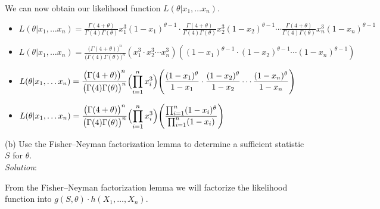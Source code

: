 \documentclass[12pt]{article}
\newcommand{\XB}{\color{black}}
\newcommand{\XV}{\color{violet}}
\begin{document}
We can now obtain our likelihood function $ L(\theta | x_{1}, \dots x_{n}) $. \\
\begin{itemize}
    \item $ \displaystyle L(\theta | x_{1}, \dots x_{n}) = \frac{\Gamma(4 + \theta)}{\Gamma(4)\Gamma(\theta)}x_{1}^{3}(1 - x_{1})^{\theta - 1} \cdot \frac{\Gamma(4 + \theta)}{\Gamma(4)\Gamma(\theta)}x_{2}^{3}(1 - x_{2})^{\theta - 1} \cdots \frac{\Gamma(4 + \theta)}{\Gamma(4)\Gamma(\theta)}x_{n}^{3}(1 - x_{n})^{\theta - 1} $
    \item $ \displaystyle L(\theta | x_{1}, \dots x_{n}) = \frac{ \bigl( \Gamma(4 + \theta) \bigr)^{n}}{ \bigl( \Gamma(4)\Gamma(\theta) \bigr)^{n}} (x_{1}^{3} \cdot x_{2}^{3} \cdots x_{n}^{3})((1 - x_{1})^{\theta - 1} \cdot (1 - x_{2})^{\theta - 1} \cdots (1 - x_{n})^{\theta - 1}) $
    \item $ \displaystyle L(\theta | x_{1}, \dots x_{n}) = \frac{ \bigl( \Gamma(4 + \theta) \bigr)^{n}}{ \bigl( \Gamma(4)\Gamma(\theta) \bigr)^{n}} \Bigl( \prod_{i=1}^{n} x_{i}^{3} \Bigr) \Biggl( \frac{(1 - x_{1})^{\theta}}{1 - x_{1}} \cdot \frac{(1 - x_{2})^{\theta}}{1 - x_{2}} \cdots \frac{(1 - x_{n})^{\theta}}{1 - x_{n}} \Biggr) $
    \item $ \displaystyle L(\theta | x_{1}, \dots x_{n}) = \frac{ \bigl( \Gamma(4 + \theta) \bigr)^{n}}{ \bigl( \Gamma(4)\Gamma(\theta) \bigr)^{n}} \Bigl( \prod_{i=1}^{n} x_{i}^{3} \Bigr) \Biggl( \frac{ \prod_{i=1}^{n} (1 - x_{i})^{\theta} }{ \prod_{i=1}^{n} (1 - x_{i}) } \Biggr) $
\end{itemize}



(b) Use the Fisher–Neyman factorization lemma to determine a sufficient statistic \\
$ S $ for $ \theta $.
\vspace{2.5mm} \\
\textit{Solution}:
\vspace{2.5mm}

\noindent
From the Fisher–Neyman factorization lemma we will factorize the likelihood function into $ g(S, \theta) \cdot h(X_{1}, \dots , X_{n}) $. \\
\end{document}
